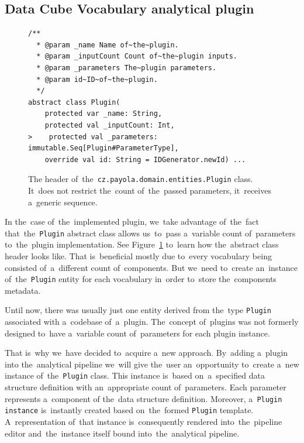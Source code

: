 \subsection{Data Cube Vocabulary analytical plugin}

\begin{figure}
  \begin{verbatim}
/**
  * @param _name Name of~the~plugin.
  * @param _inputCount Count of~the~plugin inputs.
  * @param _parameters The~plugin parameters.
  * @param id~ID~of~the~plugin.
  */
abstract class Plugin(
    protected var _name: String,
    protected val _inputCount: Int,
>    protected val _parameters: immutable.Seq[Plugin#ParameterType],
    override val id: String = IDGenerator.newId) ...
  \end{verbatim}
  \caption{The header of~the~\texttt{cz.payola.domain.entities.Plugin} class. It~does not restrict the~count
  of~the~passed parameters, it~receives a~generic sequence.}
  \label{fig:plugin-trait-code}
\end{figure}

\begin{sloppypar}
In the~case of~the~implemented plugin, we~take advantage of~the~fact that~the~\texttt{Plugin} abstract class allows us~to~pass a~variable count of~parameters to~the~plugin implementation. See Figure~\ref{fig:plugin-trait-code} to~learn how the~abstract class header 
looks like. That is~beneficial mostly due to~every vocabulary being consisted of~a~different count of~components. But we~need to~create an~instance of~the~\texttt{Plugin} entity
for each vocabulary in~order to~store the~components metadata.
\end{sloppypar}

Until now, there was usually just one entity derived from the~type \texttt{Plugin} associated with
a~codebase of~a~plugin. The~concept of~plugins was not formerly designed to~have
a~variable count of~parameters for each plugin instance.

That is~why we~have decided to~acquire a~new approach. By~adding a~plugin 
into the~analytical pipeline we~will give the~user an~opportunity to~create a~new instance of~the~\texttt{Plugin} class. This instance is~based on~a~specified data structure definition
with an~appropriate count of~parameters. Each parameter represents a~component 
of the~data structure definition. Moreover, a~\texttt{Plugin instance} is~instantly created 
based on~the~formed \texttt{Plugin} template. A~representation of~that instance is~consequently 
rendered into~the~pipeline editor and~the~instance itself bound into~the~analytical pipeline.

